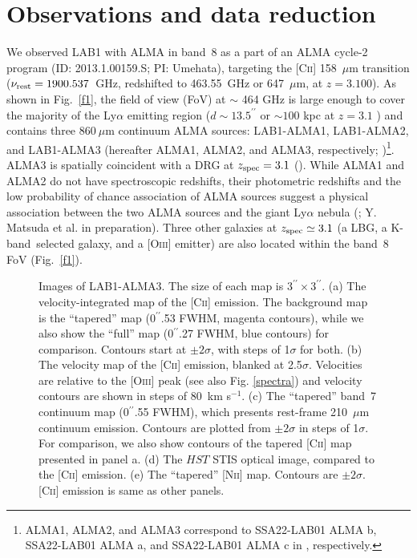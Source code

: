 \documentclass[apj]{emulateapj}
\begin{document}
\section{Observations and data reduction}

We observed LAB1 with ALMA in band~8 as a part of an ALMA cycle-2 program (ID: 2013.1.00159.S; PI: Umehata), targeting the \textsc{[Cii]} 158~$\mu$m transition ($\nu_{\rm rest}=1900.537$~GHz, redshifted to 463.55~GHz or 647~$\mu$m, at $z=3.100$).
As shown in Fig.~\ref{f1}, the field of view (FoV) at $\sim$ 464 GHz is large enough to cover the majority of the Ly$\alpha$ emitting region ($d\sim13.5^{\prime\prime}$ or $\sim 100$ kpc at $z=3.1$ ) and contains three $860~\mu$m continuum ALMA sources: LAB1-ALMA1, LAB1-ALMA2, and LAB1-ALMA3 (hereafter ALMA1, ALMA2, and ALMA3, respectively; \citealt{2016ApJ...832...37G})\footnote{ALMA1, ALMA2, and ALMA3 correspond to SSA22-LAB01 ALMA b, SSA22-LAB01 ALMA a, and SSA22-LAB01 ALMA c in \citet{2016ApJ...832...37G}, respectively.}.
ALMA3 is spatially coincident with a DRG at $z_{\rm spec}=3.1$ (\citealt{2015ApJ...799...38K}).
While ALMA1 and ALMA2 do not have spectroscopic redshifts, their photometric redshifts and 
the low probability of chance association of ALMA sources suggest a physical association between the two ALMA sources and the giant Ly$\alpha$ nebula (\citealt{2012ApJ...750..116U}; Y. Matsuda et al. in preparation).
Three other galaxies at $z_{\rm spec}\simeq3.1$ (a LBG, a K-band~selected galaxy, and a [\textsc{Oiii}] emitter) are also located within the band~8 FoV (Fig.~\ref{f1}).

\begin{figure*}
\caption{
Images of LAB1-ALMA3. The size of each map is $3^{\prime\prime}\times3^{\prime\prime}$.
(a) The velocity-integrated map of the [\textsc{Cii}] emission. The background map is the ``tapered'' map (0$^{\prime\prime}$.53 FWHM, magenta contours), while we also show the ``full'' map (0$^{\prime\prime}$.27 FWHM, blue contours) for comparison. Contours start at $\pm2\sigma$, with steps of 1$\sigma$ for both.
(b) The velocity map of the  [\textsc{Cii}] emission, blanked at 2.5$\sigma$.
Velocities are relative to the [\textsc{Oiii}] peak (see also Fig. \ref{spectra}) and velocity contours are shown in steps of 80~km s$^{-1}$.
(c) The ``tapered'' band~7 continuum map (0$^{\prime\prime}$.55 FWHM), which presents rest-frame 210~$\mu$m continuum emission.
Contours are plotted from $\pm2\sigma$ in steps of 1$\sigma$.
For comparison, we also show contours of the tapered [\textsc{Cii}] map presented in panel a.
(d) The $HST$ STIS optical image, compared to the [\textsc{Cii}] emission.
(e) The ``tapered'' [\textsc{Nii}] map. 
Contours are $\pm2\sigma$.
[\textsc{Cii}] emission is same as other panels.
}
\label{cii_map}
\end{figure*}
\end{document}
